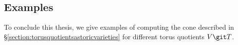 \documentclass[12pt]{amsart}
\theoremstyle{plain}
\begin{document}
%
%
%
%

\newpage
\subsection{Examples}\label{section:examples}
To conclude this thesis, we give examples of computing the cone described in \S \ref{section:torusquotientsastoricvarieties} for different torus quotients $V \git T$. \\
\end{document}
